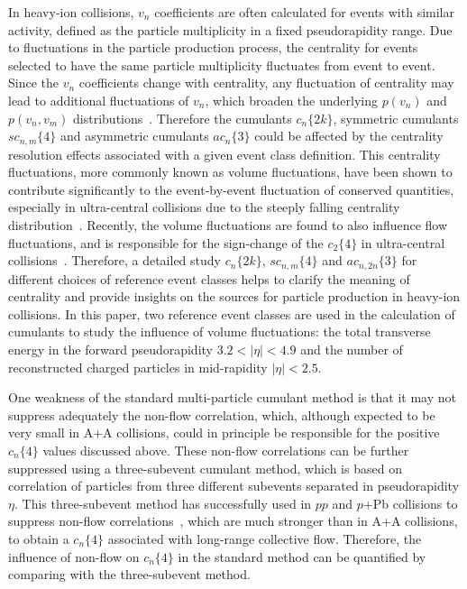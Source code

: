 In heavy-ion collisions, $v_n$ coefficients are often calculated for events with similar activity, defined as the particle multiplicity in a fixed pseudorapidity range. Due to fluctuations in the particle production process, the centrality for events selected to have the same particle multiplicity fluctuates from event to event. Since the $v_n$ coefficients change with centrality, any fluctuation of centrality may lead to additional fluctuations of $v_n$, which broaden the underlying $p(v_n)$ and $p(v_n,v_m)$ distributions~\cite{Zhou:2018fxx}. Therefore the cumulants $c_n\{2k\}$, symmetric cumulants $sc_{n,m}\{4\}$ and asymmetric cumulants $ac_n\{3\}$ could be affected by the centrality resolution effects associated with a given event class definition. This centrality fluctuations, more commonly known as volume fluctuations, have been shown to contribute significantly to the event-by-event fluctuation of conserved quantities, especially in ultra-central collisions due to the steeply falling centrality distribution~\cite{Skokov:2012ds}. Recently, the volume fluctuations are found to also influence flow fluctuations, and is responsible for the sign-change of the $c_2\{4\}$ in ultra-central collisions~\cite{ATLAS-CONF-2017-066}. Therefore, a detailed study $c_n\{2k\}$, $sc_{n,m}\{4\}$ and $ac_{n,2n}\{3\}$ for different choices of reference event classes helps to clarify the meaning of centrality and provide insights on the sources for particle production in heavy-ion collisions. In this paper, two reference event classes are used in the calculation of cumulants to study the influence of volume fluctuations: the total transverse energy in the forward pseudorapidity $3.2<|\eta|<4.9$ and the number of reconstructed charged particles in mid-rapidity $|\eta|<2.5$.

One weakness of the standard multi-particle cumulant method is that it may not suppress adequately the non-flow correlation, which, although expected to be very small in A+A collisions, could in principle be responsible for the positive $c_n\{4\}$ values discussed above. These non-flow correlations can be further suppressed using a three-subevent cumulant method, which is based on correlation of particles from three different subevents separated in pseudorapidity $\eta$. This three-subevent method has successfully used in $pp$ and $p$+Pb collisions to suppress non-flow correlations~\cite{Aaboud:2017blb}, which are much stronger than in A+A collisions, to obtain a $c_n\{4\}$ associated with long-range collective flow. Therefore, the influence of non-flow on $c_n\{4\}$ in the standard method can be quantified by comparing with the three-subevent method.

